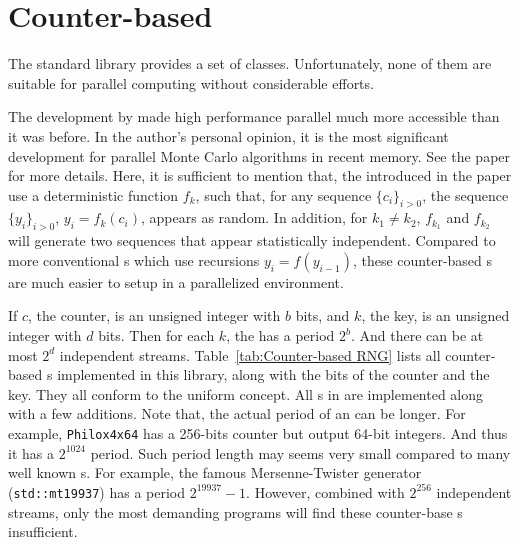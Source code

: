 \section{Counter-based \protect\rng}
\label{sec:Counter-based RNG}

The standard library provides a set of \rng classes. Unfortunately, none of
them are suitable for parallel computing without considerable efforts.

The development by \textcite{Salmon:2011um} made high performance parallel \rng
much more accessible than it was before. In the author's personal opinion, it
is the most significant development for parallel Monte Carlo algorithms in
recent memory. See the paper for more details. Here, it is sufficient to
mention that, the \rng introduced in the paper use a deterministic function
$f_k$, such that, for any sequence $\{c_i\}_{i>0}$, the sequence
$\{y_i\}_{i>0}$, $y_i = f_k(c_i)$, appears as random. In addition, for $k_1 \ne
k_2$, $f_{k_1}$ and $f_{k_2}$ will generate two sequences that appear
statistically independent. Compared to more conventional \rng{}s which use
recursions $y_i = f(y_{i - 1})$, these counter-based \rng{}s are much easier to
setup in a parallelized environment.

If $c$, the counter, is an unsigned integer with $b$ bits, and $k$, the key, is
an unsigned integer with $d$ bits. Then for each $k$, the \rng has a period
$2^b$. And there can be at most $2^d$ independent streams.
Table~\ref{tab:Counter-based RNG} lists all counter-based \rng{}s implemented
in this library, along with the bits of the counter and the key. They all
conform to the \cppoo uniform \rng concept. All \rng{}s in
\textcite{Salmon:2011um} are implemented along with a few additions. Note that,
the actual period of an \rng can be longer. For example, \verb|Philox4x64| has
a 256-bits counter but output 64-bit integers. And thus it has a $2^{1024}$
period. Such period length may seems very small compared to many well known
\rng{}s. For example, the famous Mersenne-Twister generator
(\verb|std::mt19937|) has a period $2^{19937} - 1$. However, combined with
$2^{256}$ independent streams, only the most demanding programs will find these
counter-base \rng{}s insufficient.

